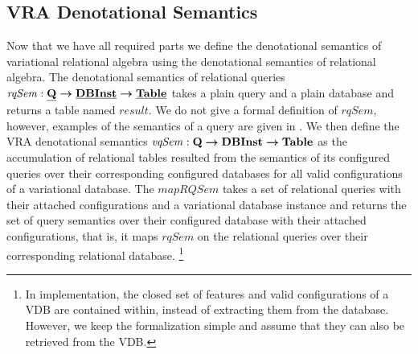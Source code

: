 \subsection{VRA Denotational Semantics }
\label{sec:vradensem}

Now that we have all required parts we define the denotational semantics of 
variational relational algebra using the denotational semantics of relational 
algebra. The denotational semantics of relational queries 
$\mathit{rqSem} : \pQSet \totype \pInstSet \totype \pTabSet$ takes a plain query and
a plain database and returns a table named $\mathit{result}$. We do not give a formal 
definition of $\mathit{rqSem}$, however, examples of the semantics
of a query are given in .
%
We then define the VRA denotational semantics 
$\mathit{vqSem} : \qSet \totype \vdbInstSet \totype \tabletype$ as the 
accumulation of relational tables resulted from the semantics of its
configured queries over their corresponding configured databases for all 
valid configurations of a variational database. 
%
The $\mathit{mapRQSem}$ takes a set of relational queries with their attached
configurations and a variational database instance and returns the set of query 
semantics over their configured database
with their attached configurations, that is, it maps $\mathit{rqSem}$ on the 
relational queries over their corresponding relational database.%
\footnote{In implementation, the closed set of features and valid configurations
of a VDB are contained within, instead of extracting them from the database. However,
we keep the formalization simple and assume that they can also be retrieved from
the VDB.}





